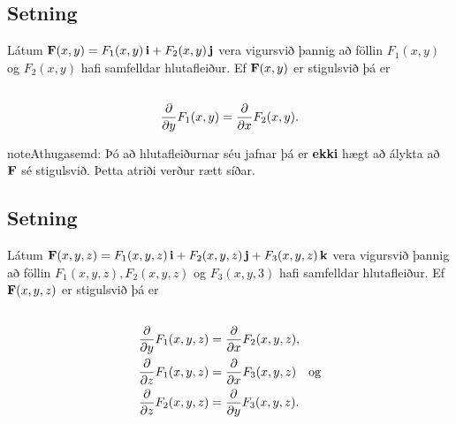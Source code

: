 \documentclass[a4paper,10pt,icelandic]{sphinxmanual}
\begin{document}
\subsection{Setning}
\label{Kafli5:setning}
Látum
\(\mbox{${\bf F}$}(x,y)=F_1(x,y)\,\mbox{${\bf i}$}+F_2(x,y)\,\mbox{${\bf j}$}\)
vera vigursvið þannig að föllin \(F_1(x,y)\) og \(F_2(x,y)\)
hafi samfelldar hlutafleiður. Ef \(\mbox{${\bf F}$}(x,y)\) er
stigulsvið þá er
\begin{gather}
\begin{split}\displaystyle\end{split}\notag\\\begin{split}\frac{\partial}{\partial y}F_1(x,y)=
\frac{\partial}{\partial x}F_2(x,y).\end{split}\notag
\end{gather}
\begin{notice}{note}{Athugasemd:}
Þó að hlutafleiðurnar séu jafnar þá er \textbf{ekki} hægt að álykta að \(\mbox{${\bf F}$}\) sé stigulsvið. Þetta atriði verður rætt síðar.
\end{notice}


\subsection{Setning}
\label{Kafli5:id4}
Látum
\(\mbox{${\bf F}$}(x,y,z)=F_1(x,y,z)\,\mbox{${\bf i}$}+F_2(x,y,z)\,\mbox{${\bf j}$}+F_3(x,y,z)\,\mbox{${\bf k}$}\)
vera vigursvið þannig að föllin \(F_1(x,y,z), F_2(x,y,z)\) og
\(F_3(x,y,3)\) hafi samfelldar hlutafleiður. Ef
\(\mbox{${\bf F}$}(x,y,z)\) er stigulsvið þá er
\begin{gather}
\begin{split}\displaystyle\end{split}\notag\\\begin{split}\begin{aligned}
\frac{\partial}{\partial y}F_1(x,y,z) &=
\frac{\partial}{\partial x}F_2(x,y,z), \\
\frac{\partial}{\partial z}F_1(x,y,z) &=
\frac{\partial}{\partial x}F_3(x,y,z) \quad \text{og} \\
\frac{\partial}{\partial z}F_2(x,y,z)&=
\frac{\partial}{\partial y}F_3(x,y,z).\end{aligned}\end{split}\notag
\end{gather}
\end{document}
